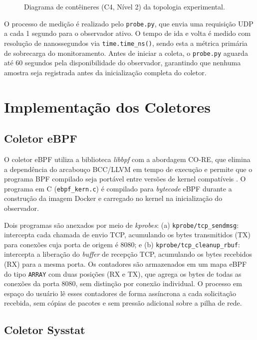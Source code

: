 \begin{figure}[htbp]
    \centering
    
    \caption{Diagrama de contêineres (C4, Nível 2) da topologia experimental.}
    \label{fig:arquitetura_c4}
\end{figure}

O processo de medição é realizado pelo \texttt{probe.py}, que envia uma requisição UDP a cada 1 segundo para o observador ativo. O tempo de ida e volta é medido com resolução de nanossegundos via \texttt{time.time\_ns()}, sendo esta a métrica primária de sobrecarga do monitoramento. Antes de iniciar a coleta, o \texttt{probe.py} aguarda até 60 segundos pela disponibilidade do observador, garantindo que nenhuma amostra seja registrada antes da inicialização completa do coletor.

\section{Implementação dos Coletores}

\subsection{Coletor eBPF}

O coletor eBPF utiliza a biblioteca \textit{libbpf} com a abordagem CO-RE, que elimina a dependência do arcabouço BCC/LLVM em tempo de execução e permite que o programa BPF compilado seja portável entre versões de kernel compatíveis \cite{gregg_bpf_2019}. O programa em C (\texttt{ebpf\_kern.c}) é compilado para \textit{bytecode} eBPF durante a construção da imagem Docker e carregado no kernel na inicialização do observador.

Dois programas são anexados por meio de \textit{kprobes}: (a) \texttt{kprobe/tcp\_sendmsg}: intercepta cada chamada de envio TCP, acumulando os bytes transmitidos (TX) para conexões cuja porta de origem é 8080; e (b) \texttt{kprobe/tcp\_cleanup\_rbuf}: intercepta a liberação do \textit{buffer} de recepção TCP, acumulando os bytes recebidos (RX) para a mesma porta. Os contadores são armazenados em um mapa eBPF do tipo \texttt{ARRAY} com duas posições (RX e TX), que agrega os bytes de todas as conexões da porta 8080, sem distinção por conexão individual. O processo em espaço do usuário lê esses contadores de forma assíncrona a cada solicitação recebida, sem cópias de pacotes e sem pressão adicional sobre a pilha de rede.

\subsection{Coletor Sysstat}

